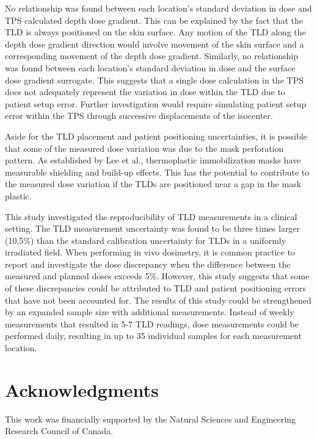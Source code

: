 No relationship was found between each location’s standard deviation in dose and TPS calculated depth dose gradient. This can be explained by the fact that the TLD is always positioned on the skin surface. Any motion of the TLD along the depth dose gradient direction would involve movement of the skin surface and a corresponding movement of the depth dose gradient. Similarly, no relationship was found between each location’s standard deviation in dose and the surface dose gradient surrogate. This suggests that a single dose calculation in the TPS does not adequately represent the variation in dose within the TLD due to patient setup error. Further investigation would require simulating patient setup error within the TPS through successive displacements of the isocenter.

Aside for the TLD placement and patient positioning uncertainties, it is possible that some of the measured dose variation was due to the mask perforation pattern. As established by Lee et al.\cite{Lee2002}, thermoplastic immobilization masks have measurable shielding and build-up effects. This has the potential to contribute to the measured dose variation if the TLDs are positioned near a gap in the mask plastic.

This study investigated the reproducibility of TLD measurements in a clinical setting. The TLD measurement uncertainty was found to be three times larger (10.5\%) than the standard calibration uncertainty for TLDs in a uniformly irradiated field. When performing in vivo dosimetry, it is common practice to report and investigate the dose discrepancy when the difference between the measured and planned doses exceeds 5\%.\cite{Essers1999} However, this study suggests that some of these discrepancies could be attributed to TLD and patient positioning errors that have not been accounted for. The results of this study could be strengthened by an expanded sample size with additional measurements. Instead of weekly measurements that resulted in 5-7 TLD readings, dose measurements could be performed daily, resulting in up to 35 individual samples for each measurement location.

\section*{Acknowledgments}
This work was financially supported by the Natural Sciences and Engineering Research Council of Canada.